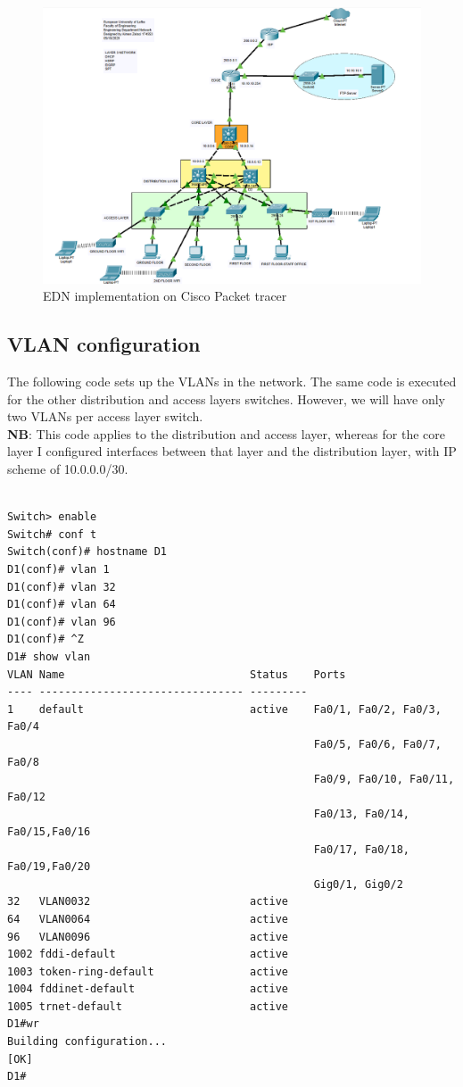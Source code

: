 \documentclass[ a4, 12pt, onecolumn]{IEEEtran}
\begin{document}
\begin{figure}[H]
\caption{EDN implementation on Cisco Packet tracer}
\begin{center}
  \includegraphics[width=0.95\linewidth]{packett.png}
\end{center}
\label{fig:pckt}
\end{figure}

\subsection{VLAN configuration}
The following code sets up the VLANs in the network. The same code is executed for the other distribution and access layers switches. However, we will have only two VLANs per access layer switch.\\
\textbf{NB}: This code applies to the distribution and access layer, whereas for the core layer I configured interfaces between that layer and the distribution layer, with IP scheme of 10.0.0.0/30.
\begin{center}
\begin{lstlisting}

Switch> enable
Switch# conf t
Switch(conf)# hostname D1
D1(conf)# vlan 1
D1(conf)# vlan 32
D1(conf)# vlan 64
D1(conf)# vlan 96
D1(conf)# ^Z
D1# show vlan
VLAN Name                             Status    Ports
---- -------------------------------- ---------
1    default                          active    Fa0/1, Fa0/2, Fa0/3, Fa0/4
                                                Fa0/5, Fa0/6, Fa0/7, Fa0/8
                                                Fa0/9, Fa0/10, Fa0/11, Fa0/12
                                                Fa0/13, Fa0/14, Fa0/15,Fa0/16
                                                Fa0/17, Fa0/18, Fa0/19,Fa0/20
                                                Gig0/1, Gig0/2
32   VLAN0032                         active    
64   VLAN0064                         active    
96   VLAN0096                         active    
1002 fddi-default                     active    
1003 token-ring-default               active    
1004 fddinet-default                  active    
1005 trnet-default                    active    
D1#wr
Building configuration...
[OK]
D1#
\end{lstlisting}
\end{center}
\end{document}
